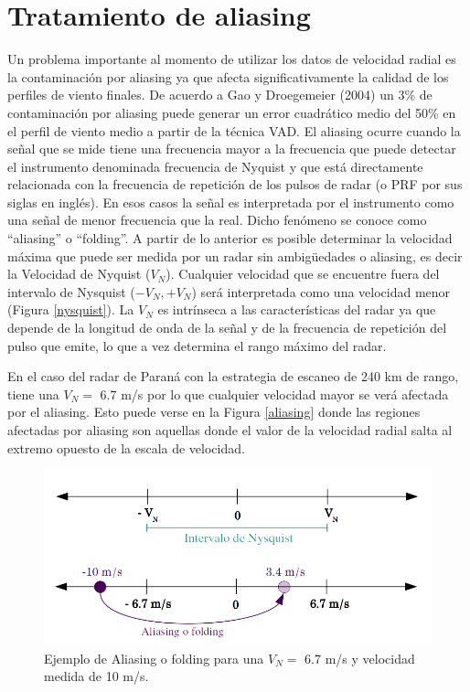 \documentclass[12pt,spanish,oneside, a4paper]{book}
\begin{document}
\section{\texorpdfstring{Tratamiento de aliasing
\label{sec-aliasing}}{Tratamiento de aliasing }}\label{tratamiento-de-aliasing}

Un problema importante al momento de utilizar los datos de velocidad
radial es la contaminación por aliasing ya que afecta significativamente
la calidad de los perfiles de viento finales. De acuerdo a Gao y
Droegemeier (2004) un 3\% de contaminación por aliasing puede generar un
error cuadrático medio del 50\% en el perfil de viento medio a partir de
la técnica VAD. El aliasing ocurre cuando la señal que se mide tiene una
frecuencia mayor a la frecuencia que puede detectar el instrumento
denominada frecuencia de Nyquist y que está directamente relacionada con
la frecuencia de repetición de los pulsos de radar (o PRF por sus siglas
en inglés). En esos casos la señal es interpretada por el instrumento
como una señal de menor frecuencia que la real. Dicho fenómeno se conoce
como ``aliasing'' o ``folding''. A partir de lo anterior es posible
determinar la velocidad máxima que puede ser medida por un radar sin
ambigüedades o aliasing, es decir la Velocidad de Nyquist (\(V_N\)).
Cualquier velocidad que se encuentre fuera del intervalo de Nysquist
(\(-V_N,+V_N\)) será interpretada como una velocidad menor (Figura
\ref{nysquist}). La \(V_N\) es intrínseca a las características del
radar ya que depende de la longitud de onda de la señal y de la
frecuencia de repetición del pulso que emite, lo que a vez determina el
rango máximo del radar.

En el caso del radar de Paraná con la estrategia de escaneo de 240 km de
rango, tiene una \(V_N =\) 6.7 m/s por lo que cualquier velocidad mayor
se verá afectada por el aliasing. Esto puede verse en la Figura
\ref{aliasing} donde las regiones afectadas por aliasing son aquellas
donde el valor de la velocidad radial salta al extremo opuesto de la
escala de velocidad.

\begin{figure}

{\centering \includegraphics{seudocache/Figura_aliasing} 

}

\caption{Ejemplo de Aliasing o folding para una $V_N =$ 6.7 m/s y velocidad medida de 10 m/s. \label{nysquist}}\label{fig:nysquist}
\end{figure}
\end{document}
